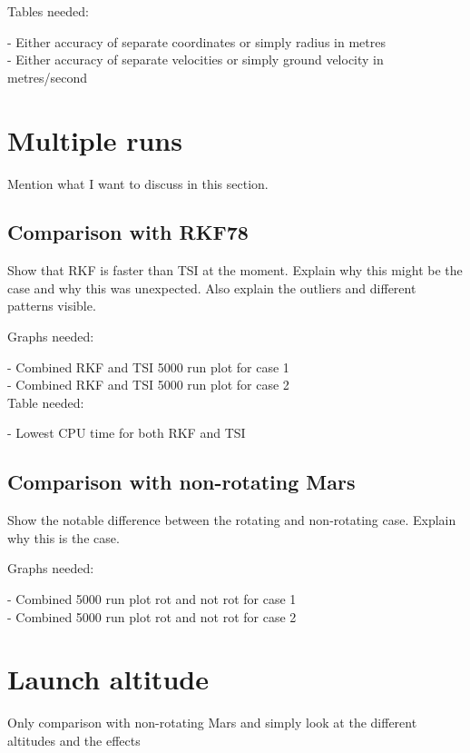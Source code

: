 Tables needed:

- Either accuracy of separate coordinates or simply radius in metres \\
- Either accuracy of separate velocities or simply ground velocity in metres/second \\


\section{Multiple runs}
\label{sec:multipleRuns}

Mention what I want to discuss in this section.

\subsection{Comparison with \ac{RKF78}}
\label{subsec:timeCompRKF}
Show that RKF is faster than TSI at the moment. Explain why this might be the case and why this was unexpected. Also explain the outliers and different patterns visible. 

Graphs needed:

- Combined RKF and TSI 5000 run plot for case 1 \\
- Combined RKF and TSI 5000 run plot for case 2 \\

Table needed:

- Lowest CPU time for both RKF and TSI \\



\subsection{Comparison with non-rotating Mars}
\label{subsec:timeCompNotRot}
Show the notable difference between the rotating and non-rotating case. Explain why this is the case.

Graphs needed:

- Combined 5000 run plot rot and not rot for case 1 \\
- Combined 5000 run plot rot and not rot for case 2 \\




\section{Launch altitude}
\label{sec:launchAltitude}

Only comparison with non-rotating Mars and simply look at the different altitudes and the effects

